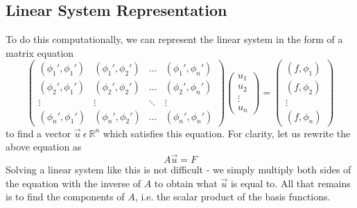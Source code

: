 \documentclass{article}
\begin{document}
\subsection{Linear System Representation}
To do this computationally, we can represent the linear system in the form of a matrix equation
\[\begin{pmatrix}
(\phi_1',\phi_1 ') & (\phi_1',\phi_2 ') & \hdots &(\phi_1',\phi_n ')\\
(\phi_2',\phi_1 ') & (\phi_2',\phi_2 ') & \hdots &(\phi_2',\phi_n ')\\
\vdots &  \vdots &  \ddots &  \vdots\\
(\phi_n',\phi_1 ') & (\phi_n',\phi_2 ') &\hdots &(\phi_n',\phi_n ')
\end{pmatrix}
\begin{pmatrix}
u_1\\
u_2\\
\vdots\\
u_n
\end{pmatrix} =
\begin{pmatrix}
(f , \phi_1) \\
(f , \phi_2) \\
\vdots\\
(f , \phi_n)
\end{pmatrix}\]
to find a vector $\vec{u}\ \epsilon\ \mathbb{R}^n$ which satisfies this equation. For clarity, let us rewrite the above equation as $$A \vec{u} = F$$ Solving a linear system like this is not difficult - we simply multiply both sides of the equation with the inverse of $A$ to obtain what $\vec{u}$ is equal to. All that remains is to find the components of $A$, i.e. the scalar product of the basis functions. 
\end{document}
